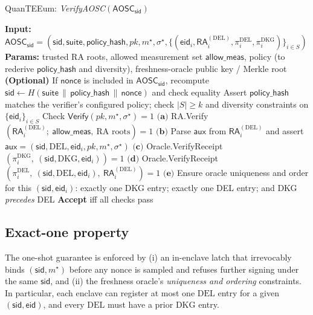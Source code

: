 \documentclass[runningheads,orivec]{llncs}
\newcommand{\prot}{\textsf{QuanTEEum}}
\newcommand{\sid}{\mathsf{sid}}
\begin{document}
\begin{algorithm}[!htbp]
\caption{\prot{}: \emph{VerifyAOSC}$(\mathsf{AOSC}_\sid)$}
\label{alg:verify-aosc}
\begin{small}
\begin{algorithmic}[1]
\State \textbf{Input:} $\mathsf{AOSC}_\sid = (\sid,\mathsf{suite},\mathsf{policy\_hash},pk,m^{\star},\sigma^{\star},\{(\mathsf{eid}_i,\mathsf{RA}^{(\mathrm{DEL})}_i,\pi_i^{\mathrm{DEL}},\pi_i^{\mathrm{DKG}})\}_{i\in S})$
\State \textbf{Params:} trusted RA roots, allowed measurement set $\textsf{allow\_meas}$, policy (to rederive $\mathsf{policy\_hash}$ and diversity), freshness-oracle public key / Merkle root
\State \textbf{(Optional)} If $\mathsf{nonce}$ is included in $\mathsf{AOSC}_\sid$, recompute $\sid \gets H(\mathsf{suite}\,\|\,\mathsf{policy\_hash}\,\|\,\mathsf{nonce})$ and check equality
\State Assert $\mathsf{policy\_hash}$ matches the verifier’s configured policy; check $|S|\ge k$ and diversity constraints on $\{\mathsf{eid}_i\}_{i\in S}$
\State Check $\mathsf{Verify}(pk,m^{\star},\sigma^{\star})=1$
  \State $\textbf{(a)}$ \textsf{RA.Verify}$(\mathsf{RA}^{(\mathrm{DEL})}_i;\ \textsf{allow\_meas},\ \text{RA roots})=1$
  \State $\textbf{(b)}$ Parse $\mathsf{aux}$ from $\mathsf{RA}^{(\mathrm{DEL})}_i$ and assert $\mathsf{aux}=(\sid,\mathrm{DEL},\mathsf{eid}_i,pk,m^{\star},\sigma^{\star})$
  \State $\textbf{(c)}$ \textsf{Oracle.VerifyReceipt}$(\pi_i^{\mathrm{DKG}},\ (\sid,\mathrm{DKG},\mathsf{eid}_i))=1$
  \State $\textbf{(d)}$ \textsf{Oracle.VerifyReceipt}$(\pi_i^{\mathrm{DEL}},\ (\sid,\mathrm{DEL},\mathsf{eid}_i),\ \mathsf{RA}^{(\mathrm{DEL})}_i)=1$
  \State $\textbf{(e)}$ Ensure oracle uniqueness and order for this $(\sid,\mathsf{eid}_i)$: exactly one DKG entry; exactly one DEL entry; and DKG \emph{precedes} DEL
\EndFor
\State \textbf{Accept} iff all checks pass
\end{algorithmic}
\end{small}
\end{algorithm}

\subsection{Exact-one property}
The one-shot guarantee is enforced by (i) an in-enclave latch that irrevocably binds $(\sid,m^{\star})$ before any nonce is sampled and refuses further signing under the same $\sid$, and (ii) the freshness oracle’s \emph{uniqueness and ordering} constraints. In particular, each enclave can register at most one $\mathrm{DEL}$ entry for a given $(\sid,\mathsf{eid})$, and every $\mathrm{DEL}$ must have a prior $\mathrm{DKG}$ entry.
\end{document}
